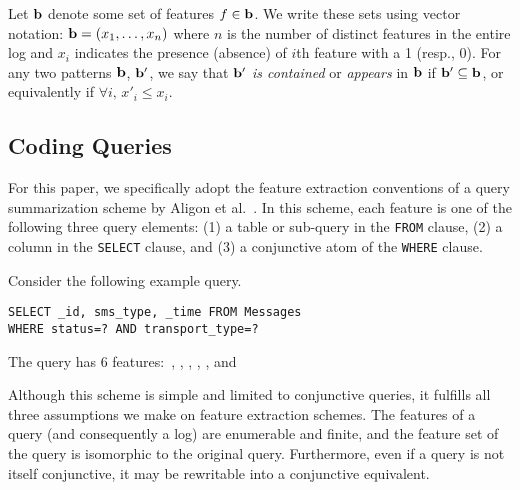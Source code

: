 Let $\mathbf{b}$ denote some set of features $f \in \mathbf{b}$.
We write these sets using vector notation: $\mathbf{b}=(x_1,\ldots,x_n)$ where $n$ is the number of distinct features in the entire log and $x_i$ indicates the presence (absence) of $i$th feature with a 1 (resp., 0).  
For any two patterns $\mathbf{b}$, $\mathbf{b}'$, we say that $\mathbf{b}'$ \emph{is contained} or \emph{appears} in $\mathbf{b}$ if $\mathbf{b}' \subseteq \mathbf{b}$, or equivalently if $\forall i,\, x'_i\leq x_i$.  


\subsection{Coding Queries}

For this paper, we specifically adopt the feature extraction conventions of a query summarization scheme by Aligon et al.~\cite{DBLP:journals/kais/AligonGMRT14}.
In this scheme, each feature is one of the following three query elements:
(1) a table or sub-query in the \texttt{FROM} clause,
(2) a column in the \texttt{SELECT} clause, and 
(3) a conjunctive atom of the \texttt{WHERE} clause.
\begin{example}
\label{exampleQuery}
Consider the following example query.
\begin{lstlisting}
SELECT _id, sms_type, _time FROM Messages
WHERE status=? AND transport_type=?
\end{lstlisting}

\noindent The query has $6$ features$:$ , 
,
,
, 
, 
and 
\end{example}

Although this scheme is simple and limited to conjunctive queries, it fulfills all three assumptions we make on feature extraction schemes.  
The features of a query (and consequently a log) are enumerable and finite, and the feature set of the query is isomorphic to the original query.
Furthermore, even if a query is not itself conjunctive, it may be rewritable into a conjunctive equivalent.


